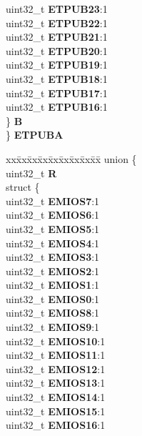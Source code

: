 \begin{DoxyCompactItemize}
\begin{tabbing}
\>\>uint32\_t {\bfseries ETPUB23}:1\\
\>\>uint32\_t {\bfseries ETPUB22}:1\\
\>\>uint32\_t {\bfseries ETPUB21}:1\\
\>\>uint32\_t {\bfseries ETPUB20}:1\\
\>\>uint32\_t {\bfseries ETPUB19}:1\\
\>\>uint32\_t {\bfseries ETPUB18}:1\\
\>\>uint32\_t {\bfseries ETPUB17}:1\\
\>\>uint32\_t {\bfseries ETPUB16}:1\\
\>\} {\bfseries B}\\
\} {\bfseries ETPUBA}\\

\end{tabbing}\item 
\mbox{\label{structSIU__tag_aa86d2dfdba3a42a102e33a6fbe25a359}} 
\begin{tabbing}
xx\=xx\=xx\=xx\=xx\=xx\=xx\=xx\=xx\=\kill
union \{\\
\>uint32\_t {\bfseries R}\\
\>struct \{\\
\>\>uint32\_t {\bfseries EMIOS7}:1\\
\>\>uint32\_t {\bfseries EMIOS6}:1\\
\>\>uint32\_t {\bfseries EMIOS5}:1\\
\>\>uint32\_t {\bfseries EMIOS4}:1\\
\>\>uint32\_t {\bfseries EMIOS3}:1\\
\>\>uint32\_t {\bfseries EMIOS2}:1\\
\>\>uint32\_t {\bfseries EMIOS1}:1\\
\>\>uint32\_t {\bfseries EMIOS0}:1\\
\>\>uint32\_t {\bfseries EMIOS8}:1\\
\>\>uint32\_t {\bfseries EMIOS9}:1\\
\>\>uint32\_t {\bfseries EMIOS10}:1\\
\>\>uint32\_t {\bfseries EMIOS11}:1\\
\>\>uint32\_t {\bfseries EMIOS12}:1\\
\>\>uint32\_t {\bfseries EMIOS13}:1\\
\>\>uint32\_t {\bfseries EMIOS14}:1\\
\>\>uint32\_t {\bfseries EMIOS15}:1\\
\>\>uint32\_t {\bfseries EMIOS16}:1\\

\end{tabbing}
\end{DoxyCompactItemize}
